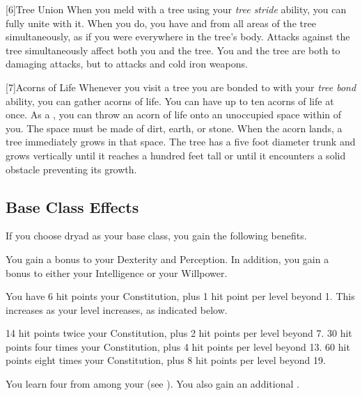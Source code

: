     [6]{Tree Union} When you meld with a tree using your \textit{tree stride} ability, you can fully unite with it.
      When you do, you have  and  from all areas of the tree simultaneously, as if you were everywhere in the tree's body.
      Attacks against the tree simultaneously affect both you and the tree.
      You and the tree are both \impervious to damaging attacks, but \vulnerable to \atFire attacks and cold iron weapons.

    [7]{Acorns of Life} Whenever you visit a tree you are bonded to with your \textit{tree bond} ability, you can gather acorns of life.
      You can have up to ten acorns of life at once.
      As a , you can throw an acorn of life onto an unoccupied  space within \medrange of you.
      The space must be made of dirt, earth, or stone.
      When the acorn lands, a tree immediately grows in that space.
      The tree has a five foot diameter trunk and grows vertically until it reaches a hundred feet tall or until it encounters a solid obstacle preventing its growth.

  \subsection{Base Class Effects}
    If you choose dryad as your base class, you gain the following benefits.

      You gain a  bonus to your Dexterity and Perception. In addition, you gain a  bonus to either your Intelligence or your Willpower.

      You have 6 hit points \add  your Constitution, plus 1 hit point per level beyond 1.
      This increases as your level increases, as indicated below.
      \begin{itemize}
         14 hit points \add twice your Constitution, plus 2 hit points per level beyond 7.
         30 hit points \add four times your Constitution, plus 4 hit points per level beyond 13.
         60 hit points \add eight times your Constitution, plus 8 hit points per level beyond 19.
      \end{itemize}

      You learn four  from among your  (see ). You also gain an additional .

